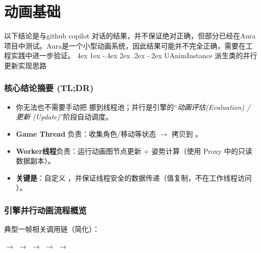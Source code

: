 \documentclass[10pt,openright,oneside,CJKmath]{MyBook}
\makeatletter
\renewcommand{\section}{\@startsection{section}{1}{\z@}%
{4ex \@plus 1ex \@minus -.4ex}%
{2ex \@plus.2ex \@minus -.2ex}%
{\color{black}\rmfamily\large\sffamily\bfseries}}
\makeatother
\begin{document}
\mainmatter


\chapter{动画基础}
以下结论是与github copilot 对话的结果，并不保证绝对正确，但部分已经在Aura项目中测试。Aura是一个小型动画系统，因此结果可能并不完全正确，需要在工程实践中进一步验证。
\section{UAnimInstance 派生类的并行更新实现思路}

\subsection{核心结论摘要 (TL;DR)}
\begin{itemize}
  \item 你无法也不需要手动把  挪到线程池；并行是引擎的“\emph{动画评估(Evaluation) / 更新 (Update)}”阶段自动调度。
  \item \textbf{Game Thread} 负责：收集角色/移动等状态 $\rightarrow$ 拷贝到 。
  \item \textbf{Worker线程}负责：运行动画图节点更新 $+$ 姿势计算（使用 Proxy 中的只读数据副本）。
  \item \textbf{关键是}：自定义 ，并保证线程安全的数据传递（值复制，不在工作线程访问 ）。
\end{itemize}

\subsection{引擎并行动画流程概览}
典型一帧相关调用链（简化）：

 $\rightarrow$  $\rightarrow$
 $\rightarrow$  $\rightarrow$  $\rightarrow$
\end{document}
